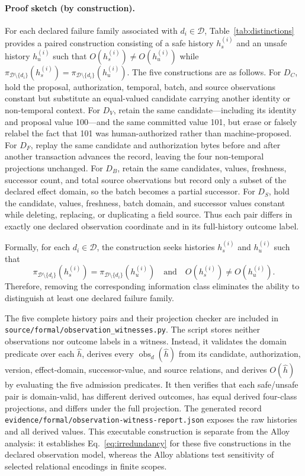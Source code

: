 \paragraph{Proof sketch (by construction).}
For each declared failure family associated with $d_i\in\mathcal D$, Table~\ref{tab:distinctions} provides a paired construction consisting of a safe history $h_s^{(i)}$ and an unsafe history $h_u^{(i)}$ such that
$O(h_s^{(i)})\neq O(h_u^{(i)})$ while
$\pi_{\mathcal D\setminus\{d_i\}}(h_s^{(i)})=\pi_{\mathcal D\setminus\{d_i\}}(h_u^{(i)})$.
The five constructions are as follows. For $D_C$, hold the proposal, authorization, temporal, batch, and source observations constant but substitute an equal-valued candidate carrying another identity or non-temporal context. For $D_V$, retain the same candidate---including its identity and proposal value 100---and the same committed value 101, but erase or falsely relabel the fact that 101 was human-authorized rather than machine-proposed. For $D_F$, replay the same candidate and authorization bytes before and after another transaction advances the record, leaving the four non-temporal projections unchanged. For $D_B$, retain the same candidates, values, freshness, successor count, and total source observations but record only a subset of the declared effect domain, so the batch becomes a partial successor. For $D_S$, hold the candidate, values, freshness, batch domain, and successor values constant while deleting, replacing, or duplicating a field source. Thus each pair differs in exactly one declared observation coordinate and in its full-history outcome label.

Formally, for each $d_i\in\mathcal D$, the construction seeks histories $h_s^{(i)}$ and $h_u^{(i)}$ such that
\begin{equation}
\pi_{\mathcal D\setminus\{d_i\}}(h_s^{(i)})
=
\pi_{\mathcal D\setminus\{d_i\}}(h_u^{(i)})
\quad\text{and}\quad
O(h_s^{(i)})\neq O(h_u^{(i)}).
\label{eq:irredundancy}
\end{equation}
Therefore, removing the corresponding information class eliminates the ability to distinguish at least one declared failure family.

The five complete history pairs and their projection checker are included in \texttt{source/formal/observation\_witnesses.py}. The script stores neither observations nor outcome labels in a witness. Instead, it validates the domain predicate over each $\widehat h$, derives every $\operatorname{obs}_d(\widehat h)$ from its candidate, authorization, version, effect-domain, successor-value, and source relations, and derives $O(\widehat h)$ by evaluating the five admission predicates. It then verifies that each safe/unsafe pair is domain-valid, has different derived outcomes, has equal derived four-class projections, and differs under the full projection. The generated record \texttt{evidence/formal/observation-witness-report.json} exposes the raw histories and all derived values. This executable construction is separate from the Alloy analysis: it establishes Eq.~\eqref{eq:irredundancy} for these five constructions in the declared observation model, whereas the Alloy ablations test sensitivity of selected relational encodings in finite scopes.

